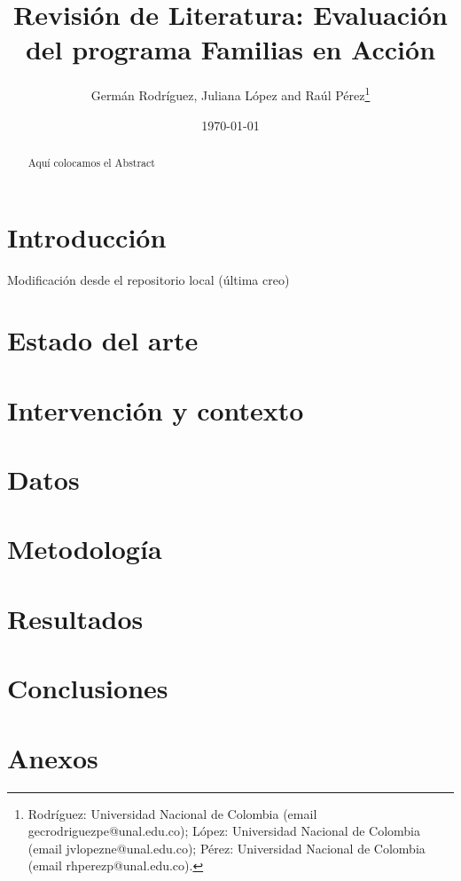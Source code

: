 \documentclass[AER]{AEA}
\begin{document}
\title{Revisión de Literatura: Evaluación del programa Familias en Acción}
\author{Germán Rodríguez, Juliana López and Raúl Pérez\thanks{Rodríguez: Universidad Nacional de Colombia (email gecrodriguezpe@unal.edu.co); López: Universidad Nacional de Colombia (email jvlopezne@unal.edu.co); Pérez: Universidad Nacional de Colombia (email rhperezp@unal.edu.co).}}
\date{\today}

\begin{abstract}
Aquí colocamos el Abstract
\end{abstract}

\maketitle

\section{Introducción}

Modificación desde el repositorio local (última creo)

\section{Estado del arte}

\section{Intervención y contexto}

\section{Datos}

\section{Metodología}

\section{Resultados}

\section{Conclusiones}

\section{Anexos}

\newpage


\end{document}
